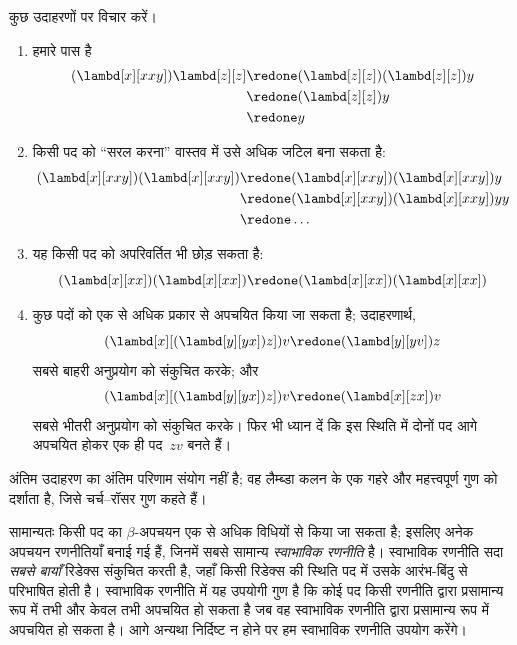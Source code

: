 \documentclass[../../../include/open-logic-section]{subfiles}
\begin{document}
कुछ उदाहरणों पर विचार करें।
\begin{enumerate}
\item हमारे पास है
\begin{align*}
(\lambd[x][xxy]) \lambd[z][z] & \redone (\lambd[z][z])(\lambd[z][z]) y \\
& \redone (\lambd[z][z]) y \\
& \redone y
\end{align*}
\item किसी पद को ``सरल करना'' वास्तव में उसे अधिक जटिल बना सकता है:
\begin{align*}
(\lambd[x][xxy])(\lambd[x][xxy]) & \redone (\lambd[x][xxy])(\lambd[x][xxy])y \\
& \redone (\lambd[x][xxy])(\lambd[x][xxy])yy \\
& \redone \dots
\end{align*}
\item यह किसी पद को अपरिवर्तित भी छोड़ सकता है:
\[
(\lambd[x][xx])(\lambd[x][xx]) \redone (\lambd[x][xx])(\lambd[x][xx])
\]
\item कुछ पदों को एक से अधिक प्रकार से अपचयित किया जा सकता है; उदाहरणार्थ,
\[
(\lambd[x][(\lambd[y][yx]) z]) v \redone (\lambd[y][yv]) z
\]
सबसे बाहरी अनुप्रयोग को संकुचित करके; और
\[
(\lambd[x][(\lambd[y][yx]) z]) v \redone (\lambd[x][zx]) v
\]
सबसे भीतरी अनुप्रयोग को संकुचित करके। फिर भी ध्यान दें कि इस स्थिति में
दोनों पद आगे अपचयित होकर एक ही पद~$zv$ बनते हैं।
\end{enumerate}

अंतिम उदाहरण का अंतिम परिणाम संयोग नहीं है; वह लैम्ब्डा कलन के एक गहरे और
महत्त्वपूर्ण गुण को दर्शाता है, जिसे चर्च--रॉसर गुण कहते हैं।

\begin{digress}
  सामान्यतः किसी पद का $\beta$-अपचयन एक से अधिक विधियों से किया जा सकता
  है; इसलिए अनेक अपचयन रणनीतियाँ बनाई गई हैं, जिनमें सबसे सामान्य
  \emph{स्वाभाविक रणनीति} है। स्वाभाविक रणनीति सदा \emph{सबसे बायाँ}
  रिडेक्स संकुचित करती है, जहाँ किसी रिडेक्स की स्थिति पद में उसके आरंभ-बिंदु
  से परिभाषित होती है। स्वाभाविक रणनीति में यह उपयोगी गुण है कि कोई पद किसी
  रणनीति द्वारा प्रसामान्य रूप में तभी और केवल तभी अपचयित हो सकता है जब वह
  स्वाभाविक रणनीति द्वारा प्रसामान्य रूप में अपचयित हो सकता है। आगे अन्यथा
  निर्दिष्ट न होने पर हम स्वाभाविक रणनीति उपयोग करेंगे।
\end{digress}
\end{document}
